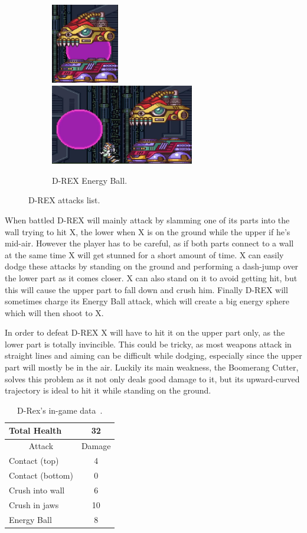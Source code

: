 \begin{figure}[htp]
	\ContinuedFloat
	\centering
	\begin{subfigure}{\linewidth}
		\centering
		\includegraphics[height=3.5cm]{figures/X1/Sigma_stages/Drex_laser_1.jpg}
		\includegraphics[height=3.5cm]{figures/X1/Sigma_stages/Drex_laser_2.jpg}
		\caption{D-REX Energy Ball.}
	\end{subfigure}
	\caption{D-REX attacks list.}
\end{figure} 
When battled D-REX will mainly attack by slamming one of its parts into the wall trying to hit X, the lower when X is on the ground while the upper if he's mid-air. However the player has to be careful, as if both parts connect to a wall at the same time X will get stunned for a short amount of time. X can easily dodge these attacks by standing on the ground and performing a dash-jump over the lower part as it comes closer. X can also stand on it to avoid getting hit, but this will cause the upper part to fall down and crush him. Finally D-REX will sometimes charge its Energy Ball attack, which will create a big energy sphere which will then shoot to X.

In order to defeat D-REX X will have to hit it on the upper part only, as the lower part is totally invincible. This could be tricky, as most weapons attack in straight lines and aiming can be difficult while dodging, especially since the upper part will mostly be in the air. Luckily its main weakness, the Boomerang Cutter, solves this problem as it not only deals good damage to it, but its upward-curved trajectory is ideal to hit it while standing on the ground.

\begin{table}[h]
	\centering
	\begin{tabular}[htp]{l c}
		\toprule
		Total Health  & 32\\
		\midrule
		\multicolumn{1}{c}{Attack} & \multicolumn{1}{c}{Damage}\\
		Contact (top) & 4\\
		Contact (bottom) & 0\\
		Crush into wall & 6\\
		Crush in jaws & 10\\
		Energy Ball & 8\\
		\bottomrule
	\end{tabular}
	\caption{D-Rex's in-game data~\cite{wiki:D-REX}.}
\end{table}


